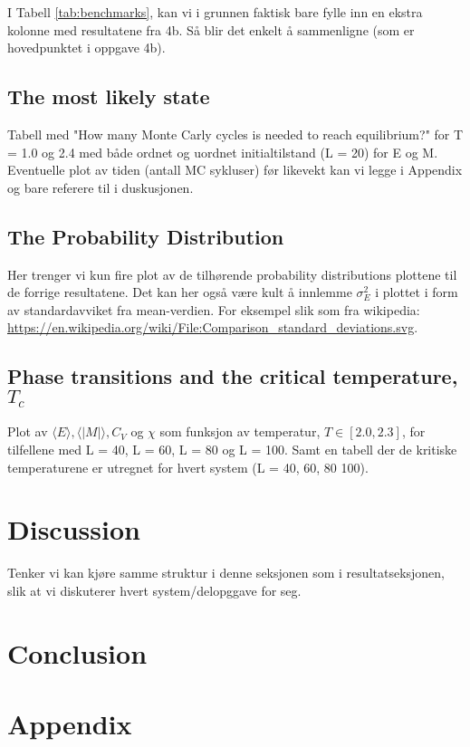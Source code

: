 \documentclass[12pt,english,a4paper]{article}
\begin{document}
I Tabell \ref{tab:benchmarks}, kan vi i grunnen faktisk bare fylle inn en ekstra kolonne med resultatene fra 4b. Så blir det enkelt å sammenligne (som er hovedpunktet i oppgave 4b).

\subsection{The most likely state}

Tabell med "How many Monte Carly cycles is needed to reach equilibrium?" for T = 1.0 og 2.4 med både ordnet og uordnet initialtilstand (L = 20) for E og M. Eventuelle plot av tiden (antall MC sykluser) før likevekt kan vi legge i Appendix og bare referere til i duskusjonen.

\subsection{The Probability Distribution}

Her trenger vi kun fire plot av de tilhørende probability distributions plottene til de forrige resultatene. Det kan her også være kult å innlemme $\sigma _E^2$ i plottet i form av standardavviket fra mean-verdien. For eksempel slik som fra wikipedia: \url{https://en.wikipedia.org/wiki/File:Comparison_standard_deviations.svg}.

\subsection{Phase transitions and the critical temperature, $T_c$}

Plot av $\langle E\rangle, \langle |M|\rangle, C_V$ og $\chi$ som funksjon av temperatur, $T \in [2.0,2.3]$, for tilfellene med L = 40, L = 60, L = 80 og L = 100. Samt en tabell der de kritiske temperaturene er utregnet for hvert system (L = 40, 60, 80 100).

\section{Discussion}

Tenker vi kan kjøre samme struktur i denne seksjonen som i resultatseksjonen, slik at vi diskuterer hvert system/delopggave for seg.

\section{Conclusion}

\section{Appendix}
\end{document}
